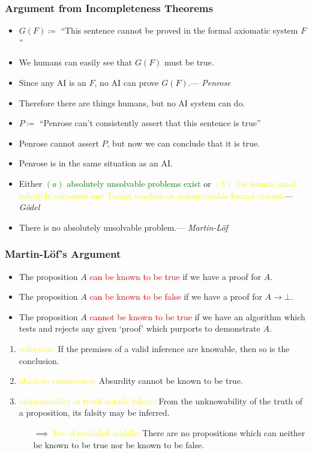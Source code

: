 \documentclass[UTF8,11pt,colorlinks,compress,openany]{beamer}%
\begin{document}
\begin{frame}\frametitle{Argument from Incompleteness Theorems}
\begin{itemize}
	\item $G(F)\coloneqq$ ``This sentence cannot be proved in the formal axiomatic system $F$''
	\item We humans can easily see that $G(F)$ must be true.
	\item Since any AI is an $F$, no AI can prove $G(F)$.\hfill --- \textsl{Penrose}
	\item Therefore there are things humans, but no AI system can do.
	\item $P\coloneqq$ ``Penrose can't consistently assert that this sentence is true''
	\item Penrose cannot assert $P$, but now we can conclude that it is true.
	\item Penrose is in the same situation as an AI.
	\item Either \textcolor{green}{$(a)$ absolutely unsolvable problems exist} or \textcolor{yellow}{$(b)$ the human mind infinitely surpasses any Turing machine or axiomatizable formal system.}\hfill --- \textsl{G\"odel}
	\item There is no absolutely unsolvable problem.\hfill --- \textsl{Martin-L\"of}
\end{itemize}
\end{frame}

\begin{frame}\frametitle{Martin-L\"of's Argument}
\begin{itemize}
	\item The proposition $A$ \textcolor{red}{can be known to be true} if we have a proof for $A$.
	\item The proposition $A$ \textcolor{red}{can be known to be false} if we have a proof for $A\to\bot$.
	\item The proposition $A$ \textcolor{red}{cannot be known to be true} if we have an algorithm which tests and rejects any given `proof' which purports to demonstrate $A$.
\end{itemize}
\begin{enumerate}
	\item \textcolor{yellow}{reflection:} If the premises of a valid inference are knowable, then so is the conclusion.
	\item \textcolor{yellow}{absolute consistency:} Absurdity cannot be known to be true.
	\item \textcolor{yellow}{unknowability of truth entails falsity:} From the unknowability of the truth of a proposition, its falsity may be inferred.
	\begin{itemize}
		\item[$\implies$] \textcolor{yellow}{law of excluded middle:} There are no propositions which can neither be known to be true nor be known to be false.
	\end{itemize}
\end{enumerate}
\end{frame}
\end{document}
